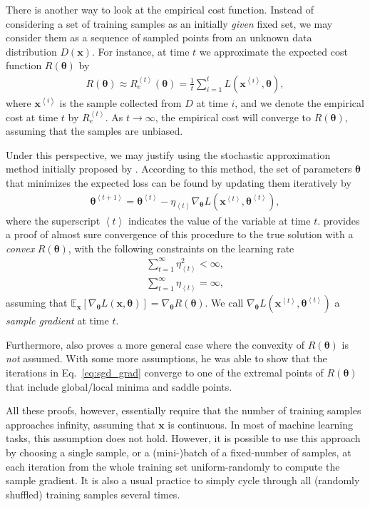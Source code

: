 \documentclass[dissertation,nocontribution]{aaltoseries}
\newcommand{\qexp}[1]{\left<#1\right>}
\newcommand{\vect}[1]{\mathbf{#1}}
\newcommand{\vects}[1]{\boldsymbol{#1}}
\newcommand{\vx}[0]{\vect{x}}
\newcommand{\TT}[0]{{\vects{\theta}}}
\newcommand{\E}[0]{\mathbb{E}}
\begin{document}
There is another way to look at the empirical cost
function. Instead of considering a set of training samples
as an initially \textit{given} fixed set, we may consider
them as a sequence of sampled points from an unknown
data distribution $D(\vx)$. For instance, at time $t$ we
approximate the expected cost function $R(\TT)$ by
\begin{align*}
    R(\TT) \approx R_e^{\qexp{t}}(\TT) = \frac{1}{t}
    \sum_{i=1}^t L(\vx^{\qexp{i}}, \TT),
\end{align*}
where $\vx^{\qexp{i}}$ is the sample collected from $D$ at time
$i$, and we denote the empirical cost at time $t$ by
$R_e^{\qexp{t}}$. As $t\to\infty$, the empirical cost will
converge to $R(\TT)$, assuming that the samples are unbiased.

Under this perspective, we may justify using the stochastic
approximation method initially proposed by
\citet{Robbins1951}.  According to this method, the set of
parameters $\TT$ that minimizes the expected loss can be
found by updating them iteratively by
\begin{align}
    \label{eq:sgd_grad}
    \TT^{\qexp{t+1}} = \TT^{\qexp{t}} - \eta_{\qexp{t}}
    \nabla_{\TT} L(\vx^{\qexp{t}},
    \TT^{\qexp{t}}),
\end{align}
where the superscript $\qexp{t}$ indicates the value of the
variable at time $t$. \citet{Bottou1998} provides a proof of
almost sure convergence of this procedure to the true
solution with a \textit{convex} $R(\TT)$, with the following
constraints on the learning rate
\begin{align}
    \label{eq:sgd_lr_cond1}
    \sum_{t=1}^\infty \eta_{\qexp{t}}^2 < \infty, \\
    \label{eq:sgd_lr_cond2}
    \sum_{t=1}^\infty \eta_{\qexp{t}} = \infty,
\end{align}
assuming that $\E_\vx \left[ \nabla_{\TT} L(\vx, \TT) \right] =
\nabla_\TT R(\TT)$. We call $\nabla_{\TT} L(\vx^{\qexp{t}},
\TT^{\qexp{t}})$ a \textit{sample gradient} at time $t$.

Furthermore, \citet{Bottou1998} also proves a more general
case where the convexity of $R(\TT)$ is \textit{not}
assumed. With some more assumptions, he was able to show
that the iterations in Eq.~\eqref{eq:sgd_grad} converge to
one of the extremal points of $R(\TT)$ that include
global/local minima and saddle points.

All these proofs, however, essentially require that the
number of training samples approaches infinity, assuming
that $\vx$ is continuous. In most of machine learning tasks,
this assumption does not hold. However, it is possible to
use this approach by choosing a single sample, or a (mini-)batch of
a fixed-number of samples, at each iteration from the whole
training set uniform-randomly to compute the sample
gradient. It is also a usual practice to simply cycle
through all (randomly shuffled) training samples several
times.
\end{document}
